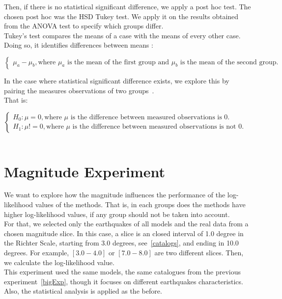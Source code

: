 Then, if there is no statistical significant difference, we apply a post hoc test. The chosen post hoc was the HSD Tukey test. We apply it on the results obtained from the ANOVA test to specify which groups differ. \\

Tukey's test compares the means of a case with the means of every other case. Doing so, it identifies differences between means :

$$\begin{cases}
\mu_a-\mu_b, \text{where $\mu_a$ is the mean of the first group and $\mu_b$ is the mean of the second group.}
\end{cases}$$

In the case where statistical significant difference exists, we explore this by pairing the measures observations of two groups~\cite{Campelo2015-01}.\\

That is:

$$\begin{cases}
H_0: \mu = 0, \text{where $\mu$ is the difference between measured observations is 0.}&\\
H_1: \mu != 0, \text{where $\mu$ is the difference between measured observations is not 0.}
\end{cases}$$\\

\section{Magnitude Experiment}\label{magExp}

We want to explore how the magnitude influences the performance of the log-likelihood values of the methods. That is, in each groups does the methods have higher log-likelihood values, if any group should not be taken into account.\\

For that, we selected only the earthquakes of all models and the real data from a chosen magnitude slice. In this case, a slice is an closed interval of 1.0 degree in the Richter Scale, starting from 3.0 degrees, see~\ref{catalogs}, and ending in 10.0 degrees. For example, $[3.0-4.0]$ or $[7.0-8.0]$ are two different slices. Then, we calculate the log-likelihood value.\\

This experiment used the same models, the same catalogues from the previous experiment~\ref{bigExp}, though it focuses on different earthquakes characteristics. Also, the statistical analysis is applied as the before.\\




